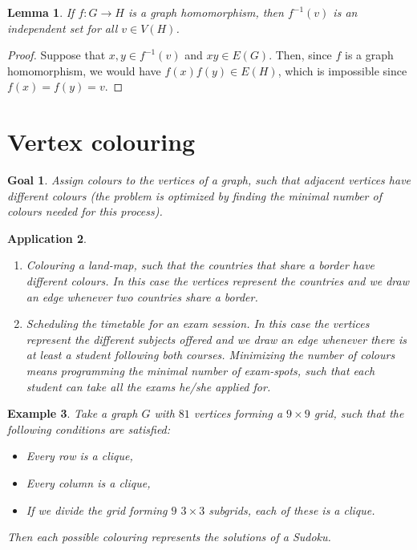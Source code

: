 \documentclass[a4paper]{article}
\theoremstyle{plain}
\newtheorem{lemma}{Lemma}
\theoremstyle{myremark}
\newtheorem{example}[lemma]{Example}
\newtheorem{application}[lemma]{Application}
\newtheorem*{goal}{Goal}
\begin{document}
\begin{lemma} If $f:G\longrightarrow H$ is a graph homomorphism, then $f^{-1}(v)$ is an independent set for all $v\in V(H)$.
\end{lemma}

\begin{proof}
Suppose that $x,y\in f^{-1}(v)$ and $xy\in E(G)$. Then, since $f$ is a graph homomorphism, we would have $f(x)f(y)\in E(H)$, which is impossible since $f(x)=f(y)=v$.
\end{proof}

\section*{Vertex colouring}
\begin{goal} Assign colours to the vertices of a graph, such that adjacent vertices have different colours (the problem is optimized by finding the minimal number of colours needed for this process).
\end{goal}

\begin{application}
\begin{enumerate}
\item Colouring a land-map, such that the countries that share a border have different colours. In this case the vertices represent the countries and we draw an edge whenever two countries share a border.
\item Scheduling the timetable for an exam session. In this case the vertices represent the different subjects offered and we draw an edge whenever there is at least a student following both courses. Minimizing the number of colours means programming the minimal number of exam-spots, such that each student can take all the exams he/she applied for.
\end{enumerate}
\end{application}

\begin{example} Take a graph $G$ with $81$ vertices forming a $9\times9$ grid, such that the following conditions are satisfied:
\begin{itemize}
\item Every row is a clique,
\item Every column is a clique,
\item If we divide the grid forming $9$ $3\times 3$ subgrids, each of these is a clique.
\end{itemize}
Then each possible colouring represents the solutions of a Sudoku.
\end{example}
\end{document}
